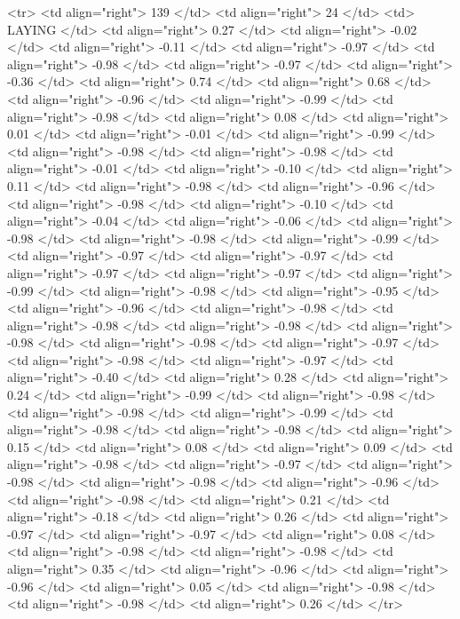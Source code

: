   <tr> <td align="right"> 139 </td> <td align="right">  24 </td> <td> LAYING </td> <td align="right"> 0.27 </td> <td align="right"> -0.02 </td> <td align="right"> -0.11 </td> <td align="right"> -0.97 </td> <td align="right"> -0.98 </td> <td align="right"> -0.97 </td> <td align="right"> -0.36 </td> <td align="right"> 0.74 </td> <td align="right"> 0.68 </td> <td align="right"> -0.96 </td> <td align="right"> -0.99 </td> <td align="right"> -0.98 </td> <td align="right"> 0.08 </td> <td align="right"> 0.01 </td> <td align="right"> -0.01 </td> <td align="right"> -0.99 </td> <td align="right"> -0.98 </td> <td align="right"> -0.98 </td> <td align="right"> -0.01 </td> <td align="right"> -0.10 </td> <td align="right"> 0.11 </td> <td align="right"> -0.98 </td> <td align="right"> -0.96 </td> <td align="right"> -0.98 </td> <td align="right"> -0.10 </td> <td align="right"> -0.04 </td> <td align="right"> -0.06 </td> <td align="right"> -0.98 </td> <td align="right"> -0.98 </td> <td align="right"> -0.99 </td> <td align="right"> -0.97 </td> <td align="right"> -0.97 </td> <td align="right"> -0.97 </td> <td align="right"> -0.97 </td> <td align="right"> -0.99 </td> <td align="right"> -0.98 </td> <td align="right"> -0.95 </td> <td align="right"> -0.96 </td> <td align="right"> -0.98 </td> <td align="right"> -0.98 </td> <td align="right"> -0.98 </td> <td align="right"> -0.98 </td> <td align="right"> -0.98 </td> <td align="right"> -0.97 </td> <td align="right"> -0.98 </td> <td align="right"> -0.97 </td> <td align="right"> -0.40 </td> <td align="right"> 0.28 </td> <td align="right"> 0.24 </td> <td align="right"> -0.99 </td> <td align="right"> -0.98 </td> <td align="right"> -0.98 </td> <td align="right"> -0.99 </td> <td align="right"> -0.98 </td> <td align="right"> -0.98 </td> <td align="right"> 0.15 </td> <td align="right"> 0.08 </td> <td align="right"> 0.09 </td> <td align="right"> -0.98 </td> <td align="right"> -0.97 </td> <td align="right"> -0.98 </td> <td align="right"> -0.98 </td> <td align="right"> -0.96 </td> <td align="right"> -0.98 </td> <td align="right"> 0.21 </td> <td align="right"> -0.18 </td> <td align="right"> 0.26 </td> <td align="right"> -0.97 </td> <td align="right"> -0.97 </td> <td align="right"> 0.08 </td> <td align="right"> -0.98 </td> <td align="right"> -0.98 </td> <td align="right"> 0.35 </td> <td align="right"> -0.96 </td> <td align="right"> -0.96 </td> <td align="right"> 0.05 </td> <td align="right"> -0.98 </td> <td align="right"> -0.98 </td> <td align="right"> 0.26 </td> </tr>
